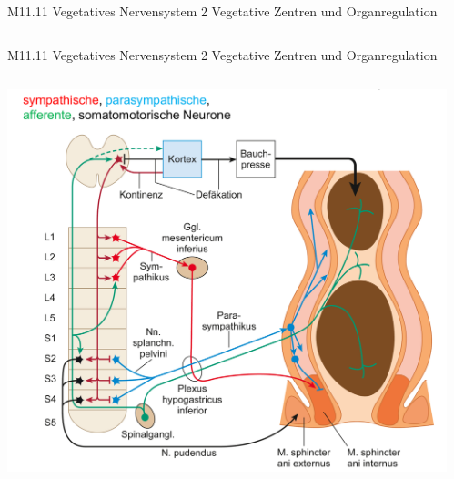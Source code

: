 \documentclass{beamer}
\begin{document}
\begin{frame}{M11.11 Vegetatives Nervensystem 2 Vegetative Zentren und Organregulation}
\begin{columns}[c]
\begin{column}{4cm}
\end{column}


\end{columns}


\end{frame}


\begin{frame}{M11.11 Vegetatives Nervensystem 2 Vegetative Zentren und Organregulation}

\begin{columns}[c]
\begin{column}{5cm}
    



\begin{center}
\includegraphics[width=\textwidth]{defecation.png}    
\end{center}

\end{column}

\begin{column}{5cm}

\pause


\end{column}
\end{columns}
\end{frame}
\end{document}
